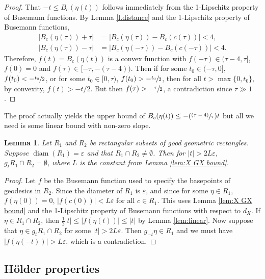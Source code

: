 \documentclass[11pt]{article}
\let\epsilon\varepsilon
\newcommand{\Ppsfrac}[2]{(\sfrac{(#1)}{#2})}
\newtheorem{lem}[thm]{Lemma}
\theoremstyle{definition}
\numberwithin{equation}{section}
\DeclareMathOperator{\diam}{diam}
\begin{document}
\begin{proof}
That $-t \leq B_{c}(\eta(t))$ follows immediately from the 1-Lipschitz property of Busemann functions. By Lemma \ref{l.distance} and the 1-Lipschitz property of Busemann functions,
\begin{align*}
|B_{c}(\eta(\tau)) + \tau | &= | B_{c}(\eta(\tau)) - B_{c}(c(\tau)) | < 4,\\ \tag*{and similarly} |B_{c}(\eta(\tau)) - \tau | &= | B_{c}(\eta(-\tau)) - B_{c}(c(-\tau)) | < 4. 
\end{align*}
Therefore, $f(t) = B_{c}(\eta(t))$ is a convex function with $f(-\tau)\in (\tau-4,\tau]$, $f(0)=0$ and $f(\tau) \in [-\tau,-(\tau-4))$. Then if for some $t_0 \in (-\tau,0]$, $f(t_0) < -\sfrac{t_0}{2}$, or for some $t_0 \in [0,\tau)$, $f(t_0)>-\sfrac{t_0}{2}$, then for all $t>\max\{0,t_0\}$, by convexity, $f(t) > -t/2$. But then $f(\tau) > -\sfrac{\tau}{2}$, a contradiction since $\tau\gg 1$.
\end{proof}

The proof actually yields the upper bound of $B_{c}(\eta(t)) \leq - \Ppsfrac{\tau-4}{\tau} t$ but all we need is some linear bound with non-zero slope.

\begin{lem}\label{lem:deform tool}
Let $R_1$ and $R_2$ be rectangular subsets of good geometric rectangles. Suppose $\diam(R_1) = \epsilon$ and that $R_1 \cap R_2 \neq \emptyset$. Then for $|t|>2L\epsilon$, $g_tR_1 \cap R_2 = \emptyset$, where $L$ is the constant from Lemma \ref{lem:X GX bound}.
\end{lem}

\begin{proof}
Let $f$ be the Busemann function used to specify the basepoints of geodesics in $R_2$. Since the diameter of $R_1$ is $\epsilon$, and since for some $\eta\in R_1$, $f(\eta(0))=0$, $|f(c(0))| < L\epsilon$ for all $c\in R_1$. This uses Lemma \ref{lem:X GX bound} and the 1-Lipschitz property of Busemann functions with respect to $d_X$. If $\eta \in R_1 \cap R_2$, then $\frac{1}{2}|t| \leq |f(\eta(t))| \leq |t|$ by Lemma \ref{lem:linear}. Now suppose that $\eta \in g_tR_1 \cap R_2$ for some $|t|>2L\epsilon$. Then $g_{-t}\eta \in R_1$ and we must have $|f(\eta(-t))| > L\epsilon$, which is a contradiction.
\end{proof}

\subsection{Hölder properties}
\end{document}
